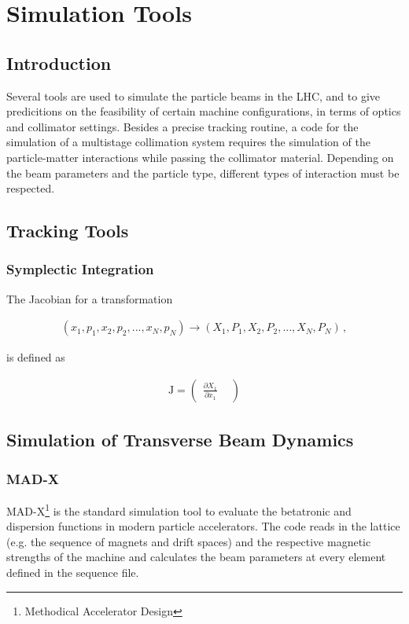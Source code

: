 \chapter{Simulation Tools}\label{chap:simulation_tools}
\section*{Introduction}
Several tools are used to simulate the particle beams in the LHC, and to give predicitions on the feasibility of certain machine configurations, in terms of optics and collimator settings. Besides a precise tracking routine, a code for the simulation of a multistage collimation system requires the simulation of the particle-matter interactions while passing the collimator material. Depending on the beam parameters and the particle type, different types of interaction must be respected. 

\section{Tracking Tools}

\subsection{Symplectic Integration}

The Jacobian for a transformation 

\begin{align}
(x_1, p_1, x_2, p_2, ..., x_N, p_N) \rightarrow (X_1,P_1, X_2, P_2,...,X_N,P_N) \, ,
\end{align}

is defined as 

\begin{align}
\mathrm{J} = 

\begin{pmatrix}
\frac{\partial X_1}{\partial x_1} & 
\end{pmatrix}

\end{align}



\section{Simulation of Transverse Beam Dynamics}
\subsection{MAD-X}
MAD-X\footnote{Methodical Accelerator Design} is the standard simulation tool to evaluate the betatronic and dispersion functions in modern particle accelerators. The code reads in the lattice (e.g. the sequence of magnets and drift spaces) and the respective magnetic strengths of the machine and calculates the beam parameters at every element defined in the sequence file. 

